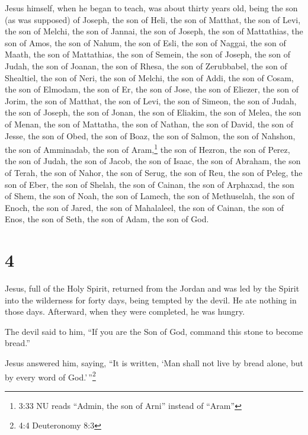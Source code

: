  Jesus himself, when he began to teach, was about thirty
years old, being the son (as was supposed) of Joseph, the son of Heli,
 the son of Matthat, the son of Levi, the son of Melchi,
the son of Jannai, the son of Joseph,  the son of
Mattathias, the son of Amos, the son of Nahum, the son of Esli, the son
of Naggai,  the son of Maath, the son of Mattathias, the
son of Semein, the son of Joseph, the son of Judah,  the
son of Joanan, the son of Rhesa, the son of Zerubbabel, the son of
Shealtiel, the son of Neri,  the son of Melchi, the son of
Addi, the son of Cosam, the son of Elmodam, the son of Er, 
the son of Jose, the son of Eliezer, the son of Jorim, the son of
Matthat, the son of Levi,  the son of Simeon, the son of
Judah, the son of Joseph, the son of Jonan, the son of Eliakim,
 the son of Melea, the son of Menan, the son of Mattatha,
the son of Nathan, the son of David,  the son of Jesse, the
son of Obed, the son of Boaz, the son of Salmon, the son of Nahshon,
 the son of Amminadab, the son of Aram,\footnote{3:33 NU
  reads ``Admin, the son of Arni'' instead of ``Aram''} the son of
Hezron, the son of Perez, the son of Judah,  the son of
Jacob, the son of Isaac, the son of Abraham, the son of Terah, the son
of Nahor,  the son of Serug, the son of Reu, the son of
Peleg, the son of Eber, the son of Shelah,  the son of
Cainan, the son of Arphaxad, the son of Shem, the son of Noah, the son
of Lamech,  the son of Methuselah, the son of Enoch, the
son of Jared, the son of Mahalaleel, the son of Cainan, 
the son of Enos, the son of Seth, the son of Adam, the son of God.

\hypertarget{section-3}{%
\section{4}\label{section-3}}

 Jesus, full of the Holy Spirit, returned from the Jordan
and was led by the Spirit into the wilderness  for forty
days, being tempted by the devil. He ate nothing in those days.
Afterward, when they were completed, he was hungry.

 The devil said to him, ``If you are the Son of God, command
this stone to become bread.''

 Jesus answered him, saying, ``It is written, `Man shall not
live by bread alone, but by every word of God.'\,''\footnote{4:4
  Deuteronomy 8:3}


